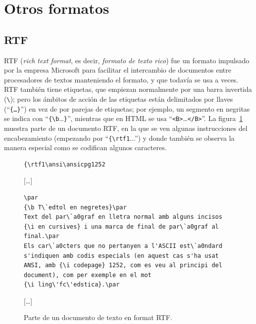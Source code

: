 \section{Otros formatos} \subsection{RTF} \label{s3:RTF} 

RTF (\emph{rich text format}, es decir, \emph{formato de texto rico}) fue un formato impulsado por la empresa Microsoft para facilitar el intercambio de documentos entre procesadores de textos manteniendo el formato, y que todavía se usa a veces. RTF también tiene etiquetas, que empiezan normalmente por una barra invertida (\texttt{\textbackslash}); pero los ámbitos de acción de las etiquetas están delimitados por llaves (``\texttt{\{\ldots\}}'') en vez de por parejas de etiquetas; por ejemplo, un segmento en negritas se indica con ``\verb+{\b+\ldots\verb+}+'', mientras que en HTML se usa ``\verb+<B>+\ldots\verb+</B>+''. La figura~\ref{fg:RTF} muestra parte de un documento RTF, en la que se ven algunas instrucciones del encabezamiento (empezando por ``\verb+{\rtf1+...'') y donde también se observa la manera especial como se codifican algunos caracteres. 

\begin{figure}
\begin{center}
\begin{verbatim}
{\rtf1\ansi\ansicpg1252
\end{verbatim}
[\ldots]
\begin{verbatim}
\par
{\b T\`edtol en negretes}\par
Text del par\`a0graf en lletra normal amb alguns incisos 
{\i en cursives} i una marca de final de par\`a0graf al 
final.\par  
Els car\`a0cters que no pertanyen a l'ASCII est\`a0ndard 
s'indiquen amb codis especials (en aquest cas s'ha usat 
ANSI, amb {\i codepage} 1252, com es veu al principi del 
document), com per exemple en el mot 
{\i ling\'fc\'edstica}.\par
\end{verbatim}
[\ldots]
\end{center}
\caption{Parte de un documento de texto en format RTF.} \label{fg:RTF} \end{figure} 

